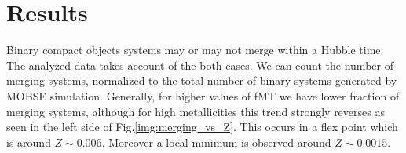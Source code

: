 \documentclass[preprint,12pt]{elsarticle}
\begin{document}
\newpage
\section{Results}

Binary compact objects systems may or may not merge within a Hubble time. The analyzed data takes account of the both cases. We can count the number of merging systems, normalized to the total number of binary systems generated by MOBSE simulation. Generally, for higher values of fMT we have lower fraction of merging systems, although for high metallicities this trend strongly reverses as seen in the left side of Fig.\ref{img:merging_vs_Z}. This occurs in a flex point which is around $Z \sim 0.006 $. Moreover a local minimum is observed around $Z \sim 0.0015$.\\
\end{document}
